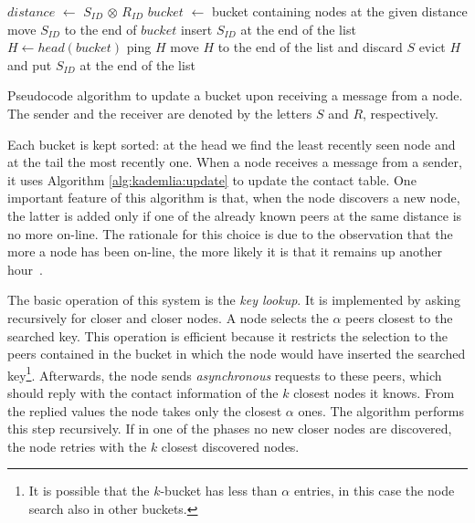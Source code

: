 \begin{algorithm}[t]
    \begin{algorithmic}
        \State $distance$ $\gets$ $S_{ID}$ $\otimes$ $R_{ID}$ \State $bucket$
        $\gets$ bucket containing nodes at the given distance  \State move $S_{ID}$ to the end of $bucket$ \Else {} \State insert $S_{ID}$ at the end of the list \Else \State $H
        \gets head(bucket)$ \State ping $H$  \State move $H$ to
        the end of the list and discard $S$ \Else \State evict $H$ and put
        $S_{ID}$ at the end of the list \EndIf \EndIf \EndIf
    \end{algorithmic}
    \caption{Pseudocode algorithm to update a bucket upon receiving a message
    from a node. The sender and the receiver are denoted by the letters $S$ and
    $R$, respectively.}
    \label{alg:kademlia:update}
\end{algorithm}

Each bucket is kept sorted: at the head we find the least recently seen node and
at the tail the most recently one. When a node receives a message from a sender,
it uses Algorithm \autoref{alg:kademlia:update} to update the contact table. One
important feature of this algorithm is that, when the node discovers a new node,
the latter is added only if one of the already known peers at the same distance
is no more on-line. The rationale for this choice is due to the observation that
the more a node has been on-line, the more likely it is that it remains up
another hour~\cite{bib:kademlia}.

The basic operation of this system is the \emph{key lookup}. It is implemented
by asking recursively for closer and closer nodes. A node selects the $\alpha$
peers closest to the searched key. This operation is efficient because it
restricts the selection to the peers contained in the bucket in which the node
would have inserted the searched key\footnote{It is possible that the $k$-bucket
has less than $\alpha$ entries, in this case the node search also in other
buckets.}. Afterwards, the node sends \emph{asynchronous} requests to these
peers, which should reply with the contact information of the $k$ closest nodes
it knows. From the replied values the node takes only the closest $\alpha$ ones.
The algorithm performs this step recursively. If in one of the phases no new
closer nodes are discovered, the node retries with the $k$ closest discovered
nodes.

